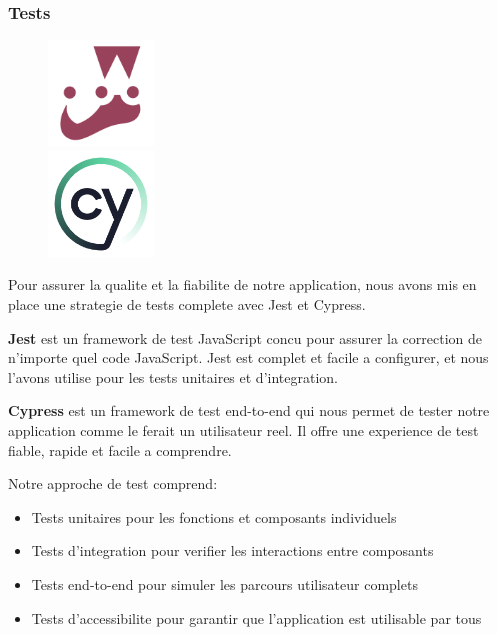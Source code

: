 \subsubsection{Tests}
\begin{figure}
    \centering
    \includegraphics[width=0.25\textwidth]{assets/docs/jest.png}\\
    \vspace{0.5cm}
    \includegraphics[width=0.25\textwidth]{assets/docs/cypress.png}
\end{figure}
Pour assurer la qualite et la fiabilite de notre application, nous avons mis en place une strategie de tests complete avec Jest et Cypress.

\textbf{Jest} est un framework de test JavaScript concu pour assurer la correction de n'importe quel code JavaScript. Jest est complet et facile a configurer, et nous l'avons utilise pour les tests unitaires et d'integration.

\textbf{Cypress} est un framework de test end-to-end qui nous permet de tester notre application comme le ferait un utilisateur reel. Il offre une experience de test fiable, rapide et facile a comprendre.

Notre approche de test comprend:
\begin{itemize}
    \item Tests unitaires pour les fonctions et composants individuels
    \item Tests d'integration pour verifier les interactions entre composants
    \item Tests end-to-end pour simuler les parcours utilisateur complets
    \item Tests d'accessibilite pour garantir que l'application est utilisable par tous
\end{itemize}

